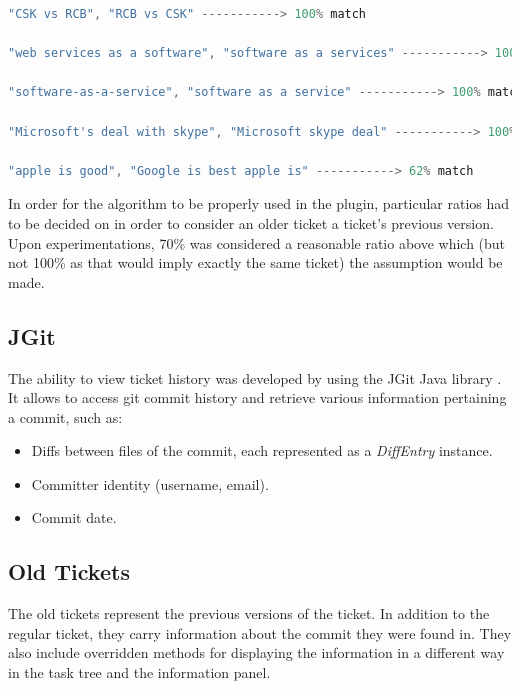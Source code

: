 \documentclass{4thYearProject}
\begin{document}
\begin{lstlisting}[language=Java, basicstyle=\footnotesize\tt,        % the size of the fonts that are used for the code
  frame=single,                    % adds a frame around the code
  language=Java,                 % the language of the code
  keywordstyle=\bf,
  showstringspaces=false]
"CSK vs RCB", "RCB vs CSK" -----------> 100% match

"web services as a software", "software as a services" -----------> 100% match

"software-as-a-service", "software as a service" -----------> 100% match

"Microsoft's deal with skype", "Microsoft skype deal" -----------> 100% match

"apple is good", "Google is best apple is" -----------> 62% match

\end{lstlisting}

In order for the algorithm to be properly used in the plugin, particular ratios had to be decided on in order to consider an older ticket a ticket's previous version. Upon experimentations, 70\% was considered a reasonable ratio above which (but not 100\% as that would imply exactly the same ticket) the assumption would be made. 

\subsection{JGit}

The ability to view ticket history was developed by using the JGit Java library \cite{jgit}. It allows to access git commit history and retrieve various information pertaining a commit, such as:

\begin{itemize}
\item Diffs between files of the commit, each represented as a \textit{DiffEntry} instance.
\item Committer identity (username, email).
\item Commit date.
\end{itemize}

\subsection{Old Tickets}

The old tickets represent the previous versions of the ticket. In addition to the regular ticket, they carry information about the commit they were found in. They also include overridden methods for displaying the information in a different way in the task tree and the information panel. 
\end{document}
